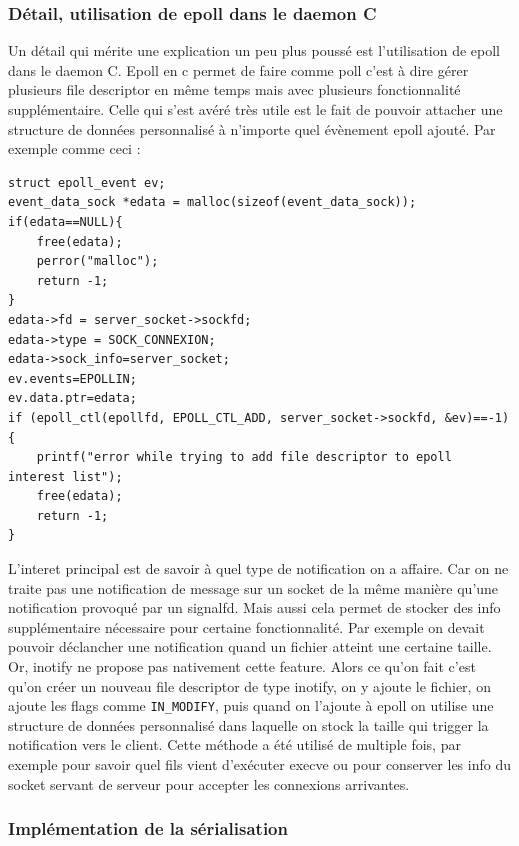 \documentclass{article}
\begin{document}
\subsubsection{Détail, utilisation de epoll dans le daemon C}

Un détail qui mérite une explication un peu plus poussé est l'utilisation de epoll dans le daemon C. Epoll en c permet de faire comme poll c'est à dire gérer plusieurs file descriptor en même temps mais avec plusieurs fonctionnalité supplémentaire. Celle qui s'est avéré très utile est le fait de pouvoir attacher une structure de données personnalisé à n'importe quel évènement epoll ajouté. Par exemple comme ceci : 

\begin{verbatim}
struct epoll_event ev;
event_data_sock *edata = malloc(sizeof(event_data_sock));
if(edata==NULL){
    free(edata);
    perror("malloc");
    return -1;
}
edata->fd = server_socket->sockfd;
edata->type = SOCK_CONNEXION;
edata->sock_info=server_socket;
ev.events=EPOLLIN;
ev.data.ptr=edata;
if (epoll_ctl(epollfd, EPOLL_CTL_ADD, server_socket->sockfd, &ev)==-1){
    printf("error while trying to add file descriptor to epoll interest list");
    free(edata);
    return -1;
}
\end{verbatim}

L'interet principal est de savoir à quel type de notification on a affaire. Car on ne traite pas une notification de message sur un socket de la même manière qu'une notification provoqué par un signalfd. Mais aussi cela permet de stocker des info supplémentaire nécessaire pour certaine fonctionnalité. Par exemple on devait pouvoir déclancher une notification quand un fichier atteint une certaine taille. Or, inotify ne propose pas nativement cette feature. Alors ce qu'on fait c'est qu'on créer un nouveau file descriptor de type inotify, on y ajoute le fichier, on ajoute les flags comme \texttt{IN\_MODIFY}, puis quand on l'ajoute à epoll on utilise une structure de données personnalisé dans laquelle on stock la taille qui trigger la notification vers le client. Cette méthode a été utilisé de multiple fois, par exemple pour savoir quel fils vient d'exécuter execve ou pour conserver les info du socket servant de serveur pour accepter les connexions arrivantes.

\subsubsection{Implémentation de la sérialisation}
\end{document}

